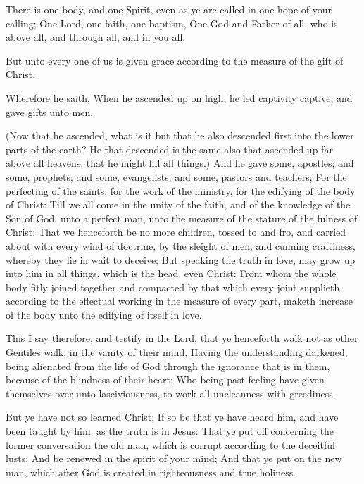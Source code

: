\Verse There is one body, and one Spirit, even as ye are called in one hope of your calling; \Verse One Lord, one faith, one baptism, \Verse One God and Father of all, who is above all, and through all, and in you all.

\Verse But unto every one of us is given grace according to the measure of the gift of Christ.

\Verse Wherefore he saith, When he ascended up on high, he led captivity captive, and gave gifts unto men.

\Verse (Now that he ascended, what is it but that he also descended first into the lower parts of the earth?  \Verse He that descended is the same also that ascended up far above all heavens, that he might fill all things.)  \Verse And he gave some, apostles; and some, prophets; and some, evangelists; and some, pastors and teachers; \Verse For the perfecting of the saints, for the work of the ministry, for the edifying of the body of Christ: \Verse Till we all come in the unity of the faith, and of the knowledge of the Son of God, unto a perfect man, unto the measure of the stature of the fulness of Christ: \Verse That we henceforth be no more children, tossed to and fro, and carried about with every wind of doctrine, by the sleight of men, and cunning craftiness, whereby they lie in wait to deceive; \Verse But speaking the truth in love, may grow up into him in all things, which is the head, even Christ: \Verse From whom the whole body fitly joined together and compacted by that which every joint supplieth, according to the effectual working in the measure of every part, maketh increase of the body unto the edifying of itself in love.

\Verse This I say therefore, and testify in the Lord, that ye henceforth walk not as other Gentiles walk, in the vanity of their mind, \Verse Having the understanding darkened, being alienated from the life of God through the ignorance that is in them, because of the blindness of their heart: \Verse Who being past feeling have given themselves over unto lasciviousness, to work all uncleanness with greediness.

\Verse But ye have not so learned Christ; \Verse If so be that ye have heard him, and have been taught by him, as the truth is in Jesus: \Verse That ye put off concerning the former conversation the old man, which is corrupt according to the deceitful lusts; \Verse And be renewed in the spirit of your mind; \Verse And that ye put on the new man, which after God is created in righteousness and true holiness.

